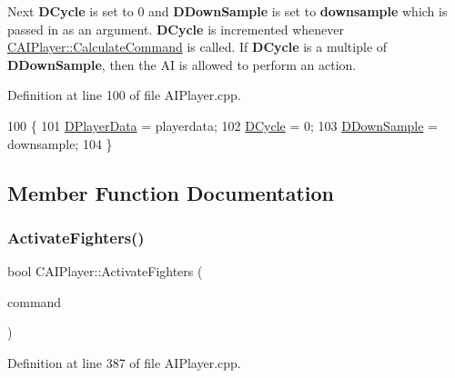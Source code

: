 Next {\bfseries D\+Cycle} is set to 0 and {\bfseries D\+Down\+Sample} is set to {\bfseries downsample} which is passed in as an argument. {\bfseries D\+Cycle} is incremented whenever \hyperlink{classCAIPlayer_ae2742efd250c7d6c00b659ccc29c4be3}{C\+A\+I\+Player\+::\+Calculate\+Command} is called. If {\bfseries D\+Cycle} is a multiple of {\bfseries D\+Down\+Sample}, then the AI is allowed to perform an action. 

Definition at line 100 of file A\+I\+Player.\+cpp.


\begin{DoxyCode}
100                                                                            \{
101     \hyperlink{classCAIPlayer_a83b5113c8f7e80df54940b647c5ee2e6}{DPlayerData} = playerdata;
102     \hyperlink{classCAIPlayer_adf12a7afe7ea86410b18eff47fa95253}{DCycle} = 0;
103     \hyperlink{classCAIPlayer_a091aed92cb9ad1a789900a6394d2f352}{DDownSample} = downsample;
104 \}
\end{DoxyCode}


\subsection{Member Function Documentation}
\hypertarget{classCAIPlayer_a4216d7e76315234a4fe22fb3a0a89c1d}{}\label{classCAIPlayer_a4216d7e76315234a4fe22fb3a0a89c1d} 
\subsubsection{\texorpdfstring{Activate\+Fighters()}{ActivateFighters()}}
{\footnotesize\ttfamily bool C\+A\+I\+Player\+::\+Activate\+Fighters (\begin{DoxyParamCaption}\item[{\hyperlink{structSPlayerCommandRequest}{S\+Player\+Command\+Request} \&}]{command }\end{DoxyParamCaption})\hspace{0.3cm}{\ttfamily [protected]}}



Definition at line 387 of file A\+I\+Player.\+cpp.


